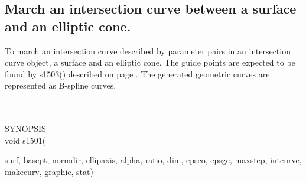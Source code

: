 \subsection{March an intersection curve between a surface and an
\mbox{elliptic} cone.}
\begin{minipg1}
  To march an intersection curve described by parameter pairs in an intersection
  curve object, a surface and an elliptic cone.
  The guide points are expected to be found by s1503() described on
  page \pageref{s1503}.
  The generated geometric curves are represented as B-spline curves.
\end{minipg1} \\ \\
SYNOPSIS\\
        \>void s1501(\begin{minipg3}
        {\fov surf}, {\fov basept}, {\fov normdir}, {\fov ellipaxis},
        {\fov alpha}, {\fov ratio}, {\fov dim}, {\fov epsco}, {\fov epsge}, {\fov maxstep},
        {\fov intcurve}, {\fov makecurv}, {\fov graphic}, {\fov stat})
                \end{minipg3}\\[0.3ex]


